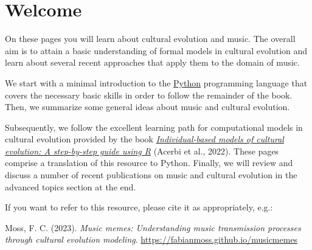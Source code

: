 \documentclass[
  a4paperpaper,
  ,captions=tableheading
]{scrbook}
\renewcommand*\contentsname{Table of contents}
\newcommand\contentsname{Table of contents}
\begin{document}



\ifdefined\Shaded\renewenvironment{Shaded}{\begin{tcolorbox}[sharp corners, frame hidden, boxrule=0pt, breakable, enhanced, borderline west={3pt}{0pt}{shadecolor}, colback={codebgcolor}]}{\end{tcolorbox}}\fi

\renewcommand*\contentsname{Table of contents}
{
\hypersetup{linkcolor=}
\setcounter{tocdepth}{2}
\tableofcontents
}

\hypertarget{welcome}{%
\chapter*{Welcome}\label{welcome}}


On these pages you will learn about cultural evolution and music. The
overall aim is to attain a basic understanding of formal models in
cultural evolution and learn about several recent approaches that apply
them to the domain of music.

We start with a minimal introduction to the
\href{https://www.python.org/}{Python} programming language that covers
the necessary basic skills in order to follow the remainder of the book.
Then, we summarize some general ideas about music and cultural
evolution.

Subsequently, we follow the excellent learning path for computational
models in cultural evolution provided by the book
\href{https://acerbialberto.com/IBM-cultevo/}{\emph{Individual-based
models of cultural evolution: A step-by-step guide using R}} (Acerbi et
al., 2022). These pages comprise a translation of this resource to
Python. Finally, we will review and discuss a number of recent
publications on music and cultural evolution in the advanced topics
section at the end.

\begin{tcolorbox}[enhanced jigsaw, arc=.35mm, left=2mm, colback=white, leftrule=.75mm, breakable, toprule=.15mm, opacityback=0, bottomrule=.15mm, rightrule=.15mm]

If you want to refer to this resource, please cite it as appropriately,
e.g.:

Moss, F. C. (2023). \emph{Music memes: Understanding music transmission
processes through cultural evolution modeling}.
\url{https://fabianmoss.github.io/musicmemes}

\end{tcolorbox}
\end{document}
